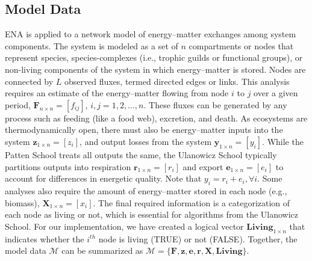 \documentclass[article]{jss}
\begin{document}
\subsection{Model Data} \label{sec:data}
ENA is applied to a network model of energy--matter exchanges among
system components.  The system is modeled as a set of $n$ compartments
or nodes that represent species, species-complexes (i.e., trophic
guilds or functional groups), or non-living components of the system
in which energy--matter is stored.  Nodes are connected by $L$
observed fluxes, termed directed edges or links.  This analysis
requires an estimate of the energy--matter flowing from node $i$ to
$j$ over a given period, $\mathbf{F}_{n\times n}=[f_{ij}]$,
$i,j=1,2,\ldots,n$.  These fluxes can be generated by any process such
as feeding (like a food web), excretion, and death.  As ecosystems are
thermodynamically open, there must also be energy--matter inputs into
the system $\mathbf{z}_{1 \times n}=[z_i]$, and output losses from the
system $\mathbf{y}_{1 \times n}=[y_i]$.  While the Patten School treats
all outputs the same, the Ulanowicz School typically partitions
outputs into respiration $\mathbf{r}_{1\times n}=[r_i]$ and export
$\mathbf{e}_{1\times n}=[e_i]$ to account for differences in energetic
quality. Note that $y_i = r_i + e_i, \forall i$.  Some analyses
also require the amount of energy--matter stored in each node (e.g.,
biomass), $\mathbf{X}_{1\times n}=[x_i]$.  The final required
information is a categorization of each node as living or not, which
is essential for algorithms from the Ulanowicz School.  For
our implementation, we have created a logical vector $\mathbf{Living}_{1 \times
  n}$ that indicates whether the $i^{th}$ node is living (TRUE)
or not (FALSE).  Together, the model data $\mathcal{M}$ can be
summarized as $\mathcal{M} =
\{\mathbf{F}, \mathbf{z}, \mathbf{e}, \mathbf{r}, \mathbf{X}, \mathbf{Living}\}$.
\end{document}

